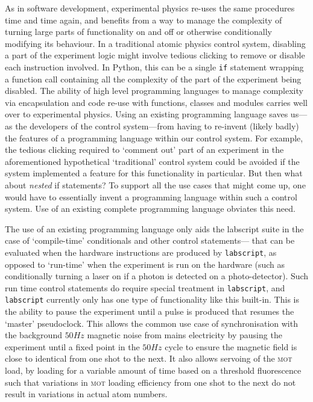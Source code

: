 As in software development, experimental physics re-uses the same procedures time and time again, and benefits from a way to manage the complexity of turning large parts of functionality on and off or otherwise conditionally modifying its behaviour. In a traditional atomic physics control system, disabling a part of the experiment logic might involve tedious clicking to remove or disable each instruction involved. In Python, this can be a single \texttt{if} statement wrapping a function call containing all the complexity of the part of the experiment being disabled. The ability of high level programming languages to manage complexity via encapsulation and code re-use with functions, classes and modules carries well over to experimental physics. Using an existing programming language saves us---as the developers of the control system---from having to re-invent (likely badly) the features of a programming language within our control system. For example, the tedious clicking required to `comment out' part of an experiment in the aforementioned hypothetical `traditional' control system could be avoided if the system implemented a feature for this functionality in particular. But then what about \emph{nested} if statements? To support all the use cases that might come up, one would have to essentially invent a programming language within such a control system. Use of an existing complete programming language obviates this need.

The use of an existing programming language only aids the labscript suite in the case of `compile-time' conditionals and other control statements--- that can be evaluated when the hardware instructions are produced by \texttt{labscript}, as opposed to `run-time' when the experiment is run on the hardware (such as conditionally turning a laser on if a photon is detected on a photo-detector). Such run time control statements do require special treatment in \texttt{labscript}, and \texttt{labscript} currently only has one type of functionality like this built-in. This is the ability to pause the experiment until a pulse is produced that resumes the `master' pseudoclock. This allows the common use case of synchronisation with the background $50\unit{Hz}$ magnetic noise from mains electricity by pausing the experiment until a fixed point in the $50\unit{Hz}$ cycle to ensure the magnetic field is close to identical from one shot to the next. It also allows servoing of the \textsc{mot} load, by loading for a variable amount of time based on a threshold fluorescence such that variations in \textsc{mot} loading efficiency from one shot to the next do not result in variations in actual atom numbers.

